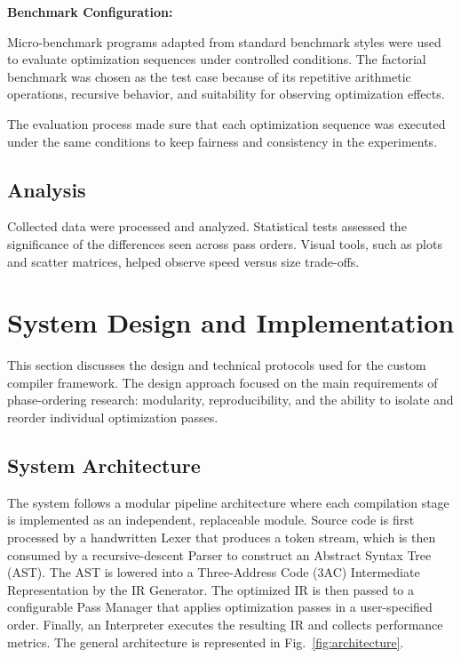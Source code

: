 \documentclass[conference]{IEEEtran}
\begin{document}
\textbf{Benchmark Configuration:}

Micro-benchmark programs adapted from standard benchmark styles were used to evaluate optimization sequences under controlled conditions. The factorial benchmark was chosen as the test case because of its repetitive arithmetic operations, recursive behavior, and suitability for observing optimization effects.

The evaluation process made sure that each optimization sequence was executed under the same conditions to keep fairness and consistency in the experiments.

\subsection{Analysis}

Collected data were processed and analyzed. Statistical tests assessed the significance of the differences seen across pass orders. Visual tools, such as plots and scatter matrices, helped observe speed versus size trade-offs.

\section{System Design and Implementation}

This section discusses the design and technical protocols used for the custom compiler framework. The design approach focused on the main requirements of phase-ordering research: modularity, reproducibility, and the ability to isolate and reorder individual optimization passes.
\subsection{System Architecture}
The system follows a modular pipeline architecture where each compilation stage is implemented as an independent, replaceable module. Source code is first processed by a handwritten Lexer that produces a token stream, which is then consumed by a recursive-descent Parser to construct an Abstract Syntax Tree (AST). The AST is lowered into a Three-Address Code (3AC) Intermediate Representation by the IR Generator. The optimized IR is then passed to a configurable Pass Manager that applies optimization passes in a user-specified order. Finally, an Interpreter executes the resulting IR and collects performance metrics. The general architecture is represented in Fig.~\ref{fig:architecture}.
\end{document}
